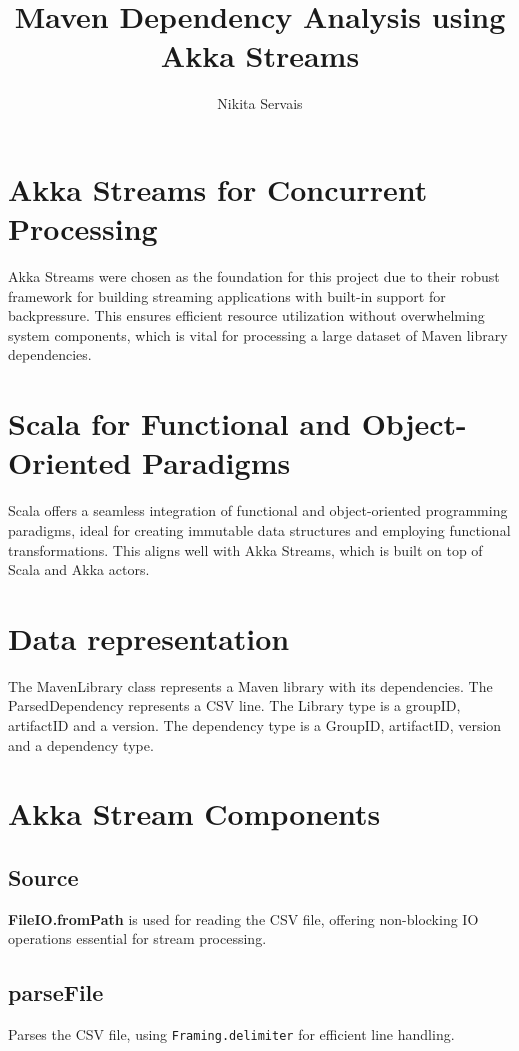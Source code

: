 \documentclass{article}
\title{Maven Dependency Analysis using Akka Streams}
\author{Nikita Servais}
\begin{document}
    \maketitle

    \section*{Akka Streams for Concurrent Processing}
    Akka Streams were chosen as the foundation for this project due to their robust framework for building streaming applications with built-in support for backpressure. This ensures efficient resource utilization without overwhelming system components, which is vital for processing a large dataset of Maven library dependencies.

    \section*{Scala for Functional and Object-Oriented Paradigms}
    Scala offers a seamless integration of functional and object-oriented programming paradigms, ideal for creating immutable data structures and employing functional transformations. This aligns well with Akka Streams, which is built on top of Scala and Akka actors.

    \section*{Data representation}
    The MavenLibrary class represents a Maven library with its dependencies.
    The ParsedDependency represents a CSV line.
    The Library type is a groupID, artifactID and a version.
    The dependency type is a GroupID, artifactID, version and a dependency type.
    \section*{Akka Stream Components}
    \subsection*{Source}
    \textbf{FileIO.fromPath} is used for reading the CSV file, offering non-blocking IO operations essential for stream processing.

    \subsection*{parseFile}
    Parses the CSV file, using \texttt{Framing.delimiter} for efficient line handling.
\end{document}
